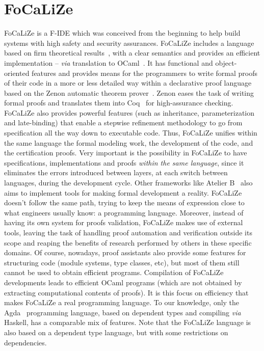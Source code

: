 \documentclass[submission,copyright,creativecommons]{eptcs}
\def\focalize{FoCaLiZe \mbox{}}
\begin{document}
\section{\focalize}




\focalize\cite{foc03} is a F-IDE
which was conceived from the
beginning to help build systems with high
safety and security assurances. \focalize includes
a language based on firm theoretical
results~\cite{PrevostoJAR02}, with a clear semantics and provides an efficient
implementation -- {\it via} translation to OCaml~\cite{ocamldocu}.  It has
functional and object-oriented features and
provides means for the programmers to write formal proofs
of their
code
in a more or less detailed way
within a declarative proof language based on the Zenon automatic
theorem prover~\cite{conf/lpar/BonichonDD07}.
Zenon eases the task of writing formal proofs and
translates them into Coq~\cite{coq84} for high-assurance checking.
\focalize also provides powerful features (such as
inheritance, parameterization and late-binding) that enable
a stepwise refinement methodology to go from specification all the way
down to executable code.
Thus, \focalize unifies within the same language the formal modeling
work, the development of the code, and the certification proofs.
Very important is the possibility in \focalize to have
specifications, implementations and proofs \emph{within the same
language}, since it
eliminates the errors introduced between layers, at each switch
between languages, during the development cycle.
Other frameworks like Atelier B~\cite{Abrial96a} also aims to implement
tools for making formal development a reality. \focalize doesn't follow
the same path, trying to keep the means of expression close to what
engineers usually know: a programming language.
Moreover, instead of having its own system for proofs validation,
\focalize makes use of external tools, leaving the task of handling
proof automation and verification outside its scope and reaping
the benefits of research performed by others in these specific domains.
Of course, nowadays, proof assistants also provide some features for
structuring code (module systems, type classes, etc), but most of them
still cannot be used
to obtain efficient programs. 
Compilation of \focalize developments leads to efficient OCaml programs
(which are not obtained by extracting computational contents of
proofs). It is this focus on efficiency that makes \focalize a real programming
language. To our knowledge, only the Agda~\cite{conf/tphol/BoveDN09}
programming language, based on dependent types and compiling {\it via}
Haskell, has a comparable mix of features.
Note that the \focalize language is also based on a
dependent type language, but with some restrictions on dependencies.
\end{document}
